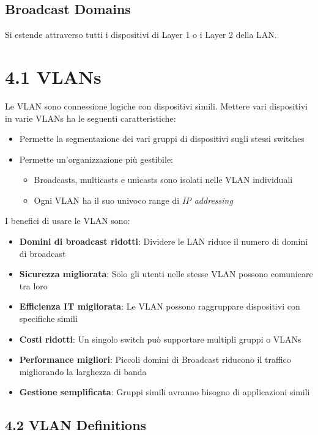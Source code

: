 \documentclass[12pt, a4paper]{article}
\begin{document}
	\subsection*{Broadcast Domains}
	
	Si estende attraverso tutti i dispositivi di Layer 1 o i Layer 2 della LAN.
	
	\section*{4.1 VLANs}
	
	Le VLAN sono connessione logiche con dispositivi simili. Mettere vari dispositivi in varie VLANs ha le seguenti caratteristiche: 
	\begin{itemize}
		\item Permette la segmentazione dei vari gruppi di dispositivi sugli stessi switches
		\item Permette un'organizzazione più gestibile:
		\begin{itemize}
			\item Broadcasts, multicasts e unicasts sono isolati nelle VLAN individuali
			\item Ogni VLAN ha il suo univoco range di \textit{IP addressing}
		\end{itemize}
	\end{itemize}

	I benefici di usare le VLAN sono:
	\begin{itemize}
		\item \textbf{Domini di broadcast ridotti}: Dividere le LAN riduce il numero di domini di broadcast
		\item \textbf{Sicurezza migliorata}: Solo gli utenti nelle stesse VLAN possono comunicare tra loro
		\item \textbf{Efficienza IT migliorata}: Le VLAN possono raggruppare dispositivi con specifiche simili
		\item \textbf{Costi ridotti}: Un singolo switch può supportare multipli gruppi o VLANs
		\item \textbf{Performance migliori}: Piccoli domini di Broadcast riducono il traffico migliorando la larghezza di banda
		\item \textbf{Gestione semplificata}: Gruppi simili avranno bisogno di applicazioni simili 
	\end{itemize}


	\subsection*{4.2 VLAN Definitions}
\end{document}
